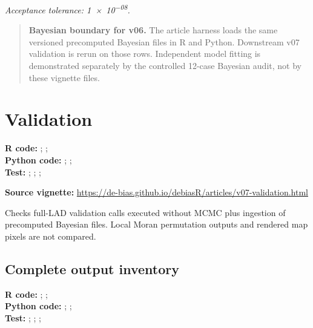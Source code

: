 \documentclass[10pt]{article}
\newenvironment{boundarybox}
  {\begin{quote}\color{blue!55!black}}
  {\end{quote}}
\begin{document}
\normalsize
\textit{Acceptance tolerance: \num{1e-08}.}

\begin{boundarybox}
\textbf{Bayesian boundary for v06.} The article harness
loads the same versioned precomputed Bayesian files in R and Python. Downstream
v07 validation is rerun on those rows. Independent model fitting is demonstrated
separately by the controlled 12-case Bayesian audit, not by these vignette files.
\end{boundarybox}

\section{Validation}
{\footnotesize \textbf{R code:} ; ; \\ \textbf{Python code:} ; ; \\ \textbf{Test:} ; ; ; \par}


\textbf{Source vignette:} \url{https://de-bias.github.io/debiasR/articles/v07-validation.html}



Checks full-LAD validation calls executed without MCMC plus ingestion of precomputed Bayesian files. Local Moran permutation outputs and rendered map pixels are not compared.



\subsection{Complete output inventory}
{\footnotesize \textbf{R code:} ; ; \\ \textbf{Python code:} ; ; \\ \textbf{Test:} ; ; ; \par}
\end{document}
